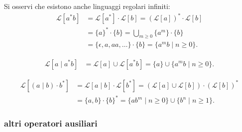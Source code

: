 Si osservi che esistono anche linguaggi regolari infiniti:
\[
\begin{aligned}
    \mathcal{L}[a^*b] &= \mathcal{L}[a^*] \cdot \mathcal{L}[b] = (\mathcal{L}[a])^* \cdot \mathcal{L}[b] \\
    &= \{a\}^* \cdot \{b\} = \bigcup_{m \geq 0} \{a^m\} \cdot \{b\} \\
    &= \{\epsilon, a, aa, \ldots\} \cdot \{b\} = \{a^m b \mid n \geq 0\}.
\end{aligned}
\]

\[
\begin{aligned}
    \mathcal{L}[a \mid a^*b] &= \mathcal{L}[a] \cup \mathcal{L}[a^*b] = \{a\} \cup \{a^m b \mid n \geq 0\}.
\end{aligned}
\]

\[
\begin{aligned}
    \mathcal{L}[(a \mid b) \cdot b^*] &= \mathcal{L}[a \mid b] \cdot \mathcal{L}[b^*] = (\mathcal{L}[a] \cup \mathcal{L}[b]) \cdot (\mathcal{L}[b])^* \\
    &= \{a, b\} \cdot \{b\}^* = \{a b^m \mid n \geq 0\} \cup \{b^n \mid n \geq 1\}.
\end{aligned}
\]

\subsubsection{altri operatori ausiliari}

